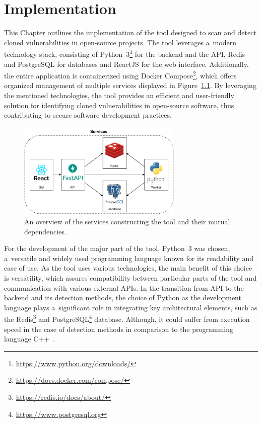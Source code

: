 
\chapter{Implementation}
\label{chapter:implementation}
  This Chapter outlines the implementation of the tool designed to scan and detect cloned vulnerabilities in open-source projects.
  The tool leverages a~modern technology stack, consisting of Python~3\footnote{\href{https://www.python.org/downloads/}
  {https://www.python.org/downloads/}} for the backend and the API, Redis and PostgreSQL
  for databases and ReactJS for the web interface. Additionally, the entire application is containerized using
  Docker Compose\footnote{\href{https://docs.docker.com/compose/}{https://docs.docker.com/compose/}},
  which offers organized management of multiple services displayed in Figure~\ref{cg-services}.
  By leveraging the mentioned technologies, the tool provides an efficient and user-friendly solution for identifying
  cloned vulnerabilities in open-source software, thus contributing to secure software development practices.

  \begin{figure}[h]
    \centering
    \includegraphics[width=0.7\textwidth]{obrazky-figures/cg_services.drawio.pdf}
    \caption{An overview of the services constructing the tool and their mutual dependencies.}
    \label{cg-services}
  \end{figure}

  For the development of the major part of the tool, Python~3 was chosen, a~versatile and widely used programming language known for its
  readability and ease of use. As the tool uses various technologies, the main benefit of this choice is versatility,
  which assures compatibility between particular parts of the tool and communication with various external APIs.
  In the transition from API to the backend and its detection methods, the choice of Python as the development language
  plays a~significant role in integrating key architectural elements, such as the Redis\footnote{\href{https://redis.io/docs/about/}{https://redis.io/docs/about/}} and
  PostgreSQL\footnote{\href{https://www.postgresql.org}{https://www.postgresql.org}} database. Although, it could suffer
  from execution speed in the case of detection methods in comparison to the programming language C++~\cite{hackrPythonVSCPP}.

